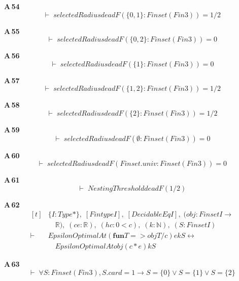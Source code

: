 \noindent\textbf{A\,54}\quad{}
{\footnotesize\[ \vdash\; \mathit{selectedRadius} \mathit{deadF} (\{ 0,1\} : \mathit{Finset} (\mathit{Fin} 3)) = 1 / 2 \]}

\noindent\textbf{A\,55}\quad{}
{\footnotesize\[ \vdash\; \mathit{selectedRadius} \mathit{deadF} (\{ 0,2\} : \mathit{Finset} (\mathit{Fin} 3)) = 0 \]}

\noindent\textbf{A\,56}\quad{}
{\footnotesize\[ \vdash\; \mathit{selectedRadius} \mathit{deadF} (\{ 1\} : \mathit{Finset} (\mathit{Fin} 3)) = 0 \]}

\noindent\textbf{A\,57}\quad{}
{\footnotesize\[ \vdash\; \mathit{selectedRadius} \mathit{deadF} (\{ 1,2\} : \mathit{Finset} (\mathit{Fin} 3)) = 1 / 2 \]}

\noindent\textbf{A\,58}\quad{}
{\footnotesize\[ \vdash\; \mathit{selectedRadius} \mathit{deadF} (\{ 2\} : \mathit{Finset} (\mathit{Fin} 3)) = 1 / 2 \]}

\noindent\textbf{A\,59}\quad{}
{\footnotesize\[ \vdash\; \mathit{selectedRadius} \mathit{deadF} (\emptyset : \mathit{Finset} (\mathit{Fin} 3)) = 0 \]}

\noindent\textbf{A\,60}\quad{}
{\footnotesize\[ \vdash\; \mathit{selectedRadius} \mathit{deadF} (\mathit{Finset}.\mathit{univ} : \mathit{Finset} (\mathit{Fin} 3)) = 0 \]}

\noindent\textbf{A\,61}\quad{}
{\footnotesize\[ \vdash\; \mathit{NestingThreshold} \mathit{deadF} (1 / 2) \]}

\noindent\textbf{A\,62}\quad{}
{\footnotesize\[ \begin{aligned}[t]
&\{ \mathit{I} : \mathit{Type}*\},\; [\mathit{Fintype} \mathit{I}],\; [\mathit{DecidableEq} \mathit{I}],\; (\mathit{obj} : \mathit{Finset} \mathit{I} \to\\
&\quad \mathbb{R} ),\; (\mathit{c} \mathit{e} : \mathbb{R} ),\; (\mathit{hc} : 0 < \mathit{c}),\; (\mathit{k} : \mathbb{N} ),\; (\mathit{S} : \mathit{Finset} \mathit{I})\\
\vdash\;&\mathit{EpsilonOptimalAt} (\mathbf{fun} \mathit{T} => \mathit{obj} \mathit{T} / \mathit{c}) \mathit{e} \mathit{k} \mathit{S} \leftrightarrow\\
&\quad \mathit{EpsilonOptimalAt} \mathit{obj} (\mathit{c} * \mathit{e}) \mathit{k} \mathit{S}
\end{aligned} \]}

\noindent\textbf{A\,63}\quad{}
{\footnotesize\[ \vdash\; \forall \mathit{S} : \mathit{Finset} (\mathit{Fin} 3), \mathit{S}.\mathit{card} = 1 \to \mathit{S} = \{ 0\} \vee \mathit{S} = \{ 1\} \vee \mathit{S} = \{ 2\} \]}


